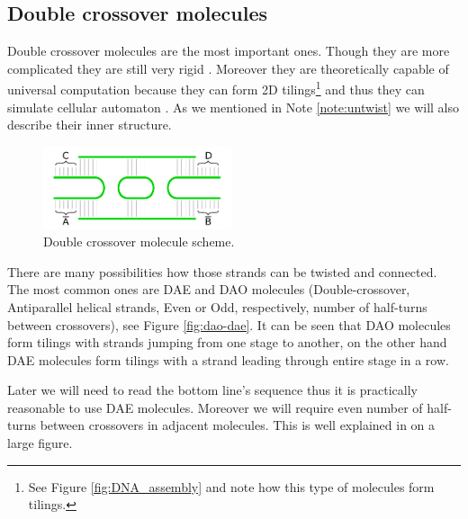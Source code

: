 	\subsection{Double crossover molecules}
	\label{sec:double_crossover}
		
		Double crossover molecules are the most important ones. Though they are more complicated they are still very rigid \cite{seeman93}. Moreover they are theoretically capable of universal computation because they can form 2D tilings\footnote{See Figure \ref{fig:DNA_assembly} and note how this type of molecules form tilings.} and thus they can simulate cellular automaton \cite{winfree_phd}. As we mentioned in Note \ref{note:untwist} we will also describe their inner structure. %
		
		\begin{figure}[H]
		\begin{center}
			\includegraphics[width=0.492\textwidth]{./figures/strand_types/double_crossover.pdf}
			\caption{Double crossover molecule scheme.}
			\label{fig:double_crossover}
		\end{center}
		\end{figure}
		
		There are many possibilities how those strands can be twisted and connected. The most common ones are DAE and DAO molecules (Double-crossover, Antiparallel helical strands, Even or Odd, respectively, number of half-turns between crossovers), see Figure \ref{fig:dao-dae}. It can be seen that DAO molecules form tilings with strands jumping from one stage to another, on the other hand DAE molecules form tilings with a strand leading through entire stage in a row.
		
		Later we will need to read the bottom line's sequence thus it is practically reasonable to use DAE molecules. Moreover we will require even number of half-turns between crossovers in adjacent molecules. This is well explained in \cite[p.37]{winfree_phd} on a large figure.
		

